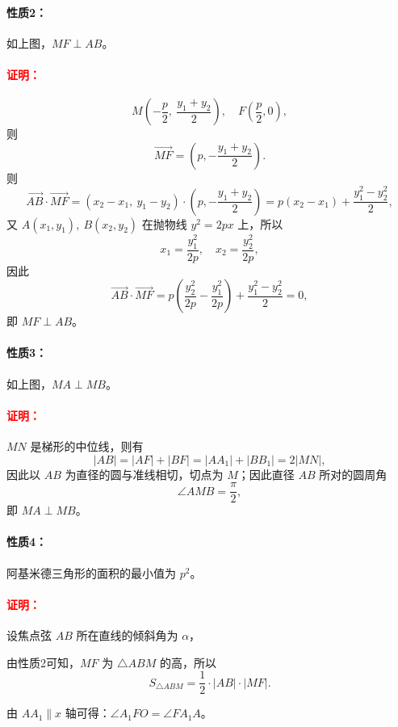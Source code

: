 \documentclass[UTF8]{ctexart}
\begin{document}
	\paragraph{\textcolor{green!60!black}{性质2：}}
	如上图，$MF\perp AB$。
	
	\paragraph{\textcolor{red}{证明：}}
	\[
	M\left(-\frac{p}{2},\ \frac{y_1+y_2}{2}\right),\quad F\left(\frac{p}{2},0\right),
	\]
	则
	\[
	\overrightarrow{MF}=\left(p,-\frac{y_1+y_2}{2}\right).
	\]
	则
	\[
	\overrightarrow{AB}\cdot\overrightarrow{MF}
	=(x_2-x_1,\ y_1-y_2)\cdot\left(p,-\frac{y_1+y_2}{2}\right)
	= p(x_2-x_1)+\frac{y_1^2-y_2^2}{2},
	\]
	又 $A(x_1,y_1),\ B(x_2,y_2)$ 在抛物线 $y^2=2px$ 上，所以
	\[
	x_1=\frac{y_1^2}{2p},\quad x_2=\frac{y_2^2}{2p},
	\]
	因此
	\[
	\overrightarrow{AB}\cdot\overrightarrow{MF}
	= p\!\left(\frac{y_2^2}{2p}-\frac{y_1^2}{2p}\right)+\frac{y_1^2-y_2^2}{2}=0,
	\]
	即 $MF\perp AB$。
	
	\paragraph{\textcolor{green!60!black}{性质3：}}
	如上图，$MA\perp MB$。
	
	\paragraph{\textcolor{red}{证明：}}
	$MN$ 是梯形的中位线，则有
	\[
	|AB|=|AF|+|BF|=|AA_1|+|BB_1|=2|MN|,
	\]
	因此以 $AB$ 为直径的圆与准线相切，切点为 $M$；因此直径 $AB$ 所对的圆周角
	\[
	\angle AMB=\frac{\pi}{2},
	\]
	即 $MA\perp MB$。
	
	\paragraph{\textcolor{green!60!black}{性质4：}}
	阿基米德三角形的面积的最小值为 $p^2$。
	
	\paragraph{\textcolor{red}{证明：}}
	设焦点弦 $AB$ 所在直线的倾斜角为 $\alpha$，
	
	由性质2可知，$MF$ 为 $\triangle ABM$ 的高，所以
	\[
	S_{\triangle ABM}=\frac12\cdot|AB|\cdot|MF|.
	\]
	
	由 $AA_1\parallel x$ 轴可得：$\angle A_1FO=\angle FA_1A$。
	
\end{document}
